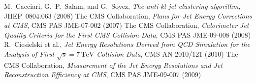 \documentclass[a4paper]{cmspaper} %
\begin{document}

\begin{thebibliography}{9}
 M.~Cacciari, G.~P.~Salam, and G.~Soyez,
  \textit{The anti-kt jet clustering algorithm},
  JHEP~0804:063 (2008)
 The CMS Collaboration,
  \textit{Plans for Jet Energy Corrections at CMS},
  CMS PAS JME-07-002 (2007)
  The CMS Collaboration,
  \textit{Calorimeter Jet Quality Criteria for the First CMS Collision Data},
  CMS PAS JME-09-008 (2008)
 R.~Ciesielski et al.,
  \textit{Jet Energy Resolutions Derived from QCD Simulation for the Analysis of First $\sqrt{s}=7\,\mathrm{TeV}$ Collision Data},
  CMS AN 2010/121 (2010)
 The CMS Collaboration,
  \textit{Measurement of the Jet Energy Resolutions and Jet Reconstruction Efficiency at CMS},
  CMS PAS JME-09-007 (2009)
\end{thebibliography}
\end{document}

